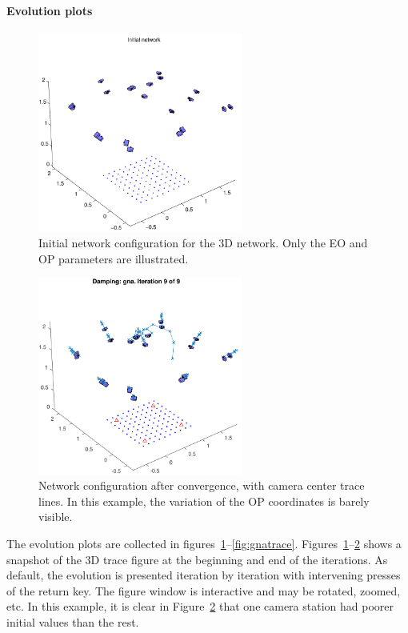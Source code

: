 \documentclass{article}
\begin{document}
\paragraph{Evolution plots}
\label{sec:orgc79c87b}

\begin{figure}[tbp]
\centering
\includegraphics[width=0.6\textwidth]{./ill/ccamx0.pdf}
\caption{\label{fig:camx0}
Initial network configuration for the 3D network. Only the EO and OP parameters are illustrated.}
\end{figure}

\begin{figure}[tbp]
\centering
\includegraphics[width=0.6\textwidth]{./ill/ccamxfinal.pdf}
\caption{\label{fig:camxfinal}
Network configuration after convergence, with camera center trace lines. In this example, the variation of the OP coordinates is barely visible.}
\end{figure}

The evolution plots are collected in
figures~\ref{fig:camx0}--\ref{fig:gnatrace}.
Figures~\ref{fig:camx0}--\ref{fig:camxfinal} shows a snapshot of the 3D trace
figure at the beginning and end of the iterations. As default, the
evolution is presented iteration by iteration with intervening presses
of the return key. The figure window is interactive and may be
rotated, zoomed, etc. In this example, it is clear in
Figure~\ref{fig:camxfinal} that one camera station had poorer initial
values than the rest.
\end{document}
